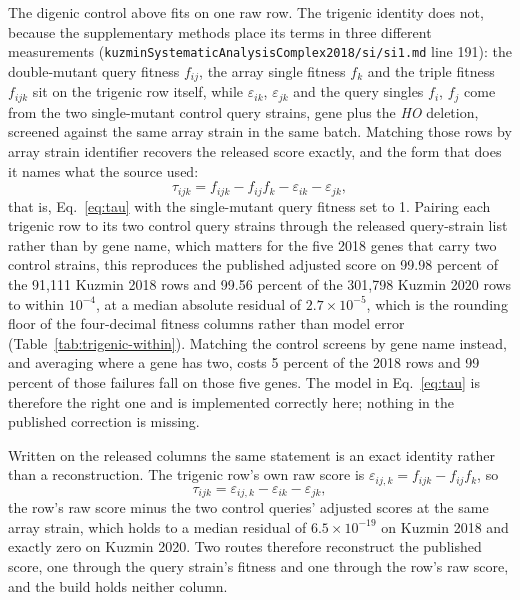 The digenic control above fits on one raw row. The trigenic identity does not, because
the supplementary methods place its terms in three different measurements
(\texttt{kuzminSystematicAnalysisComplex2018/si/si1.md} line 191): the double-mutant
query fitness $f_{ij}$, the array single fitness $f_k$ and the triple fitness
$f_{ijk}$ sit on the trigenic row itself, while $\varepsilon_{ik}$, $\varepsilon_{jk}$
and the query singles $f_i$, $f_j$ come from the two single-mutant control query
strains, gene plus the \emph{HO} deletion, screened against the same array strain in
the same batch. Matching those rows by array strain identifier recovers the released
score exactly, and the form that does it names what the source used:
\[
  \tau_{ijk} = f_{ijk} - f_{ij} f_k - \varepsilon_{ik} - \varepsilon_{jk},
\]
that is, Eq.~\ref{eq:tau} with the single-mutant query fitness set to 1. Pairing each
trigenic row to its two control query strains through the released query-strain list
rather than by gene name, which matters for the five 2018 genes that carry two control
strains, this reproduces the published adjusted score on 99.98 percent of the 91{,}111
Kuzmin 2018 rows and 99.56 percent of the 301{,}798 Kuzmin 2020 rows to within
$10^{-4}$, at a median absolute residual of $2.7\times10^{-5}$, which is the rounding
floor of the four-decimal fitness columns rather than model error
(Table~\ref{tab:trigenic-within}). Matching the control screens by gene name instead,
and averaging where a gene has two, costs 5 percent of the 2018 rows and 99 percent of
those failures fall on those five genes. The model in Eq.~\ref{eq:tau} is therefore the
right one and is implemented correctly here; nothing in the published correction is
missing.

Written on the released columns the same statement is an exact identity rather than a
reconstruction. The trigenic row's own raw score is $\varepsilon_{ij,k} = f_{ijk} -
f_{ij} f_k$, so
\[
  \tau_{ijk} = \varepsilon_{ij,k} - \varepsilon_{ik} - \varepsilon_{jk},
\]
the row's raw score minus the two control queries' adjusted scores at the same array
strain, which holds to a median residual of $6.5\times10^{-19}$ on Kuzmin 2018 and
exactly zero on Kuzmin 2020. Two routes therefore reconstruct the published score, one
through the query strain's fitness and one through the row's raw score, and the build
holds neither column.

